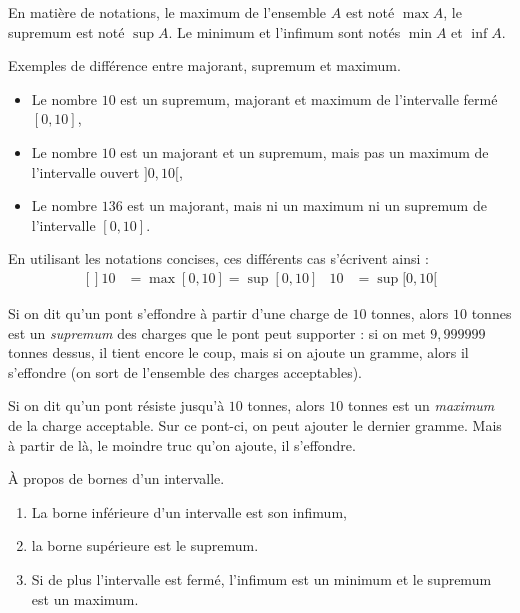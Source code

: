 En matière de notations, le maximum de l'ensemble $A$ est noté $\max A$, le supremum est noté $\sup A$. Le minimum et l'infimum sont notés $\min A$ et $\inf A$.

\begin{example}
	Exemples de différence entre majorant, supremum et maximum.
	\begin{itemize}
		\item Le nombre $10$ est un supremum, majorant et maximum de l'intervalle fermé $[0,10]$,
		\item Le nombre $10$ est un majorant et un supremum, mais pas un maximum de l'intervalle ouvert $]0,10[$,
		\item Le nombre $136$ est un majorant, mais ni un maximum ni un supremum de l'intervalle $[0,10]$.
	\end{itemize}
\end{example}

En utilisant les notations concises, ces différents cas s'écrivent ainsi :
\begin{equation}
	\begin{aligned}[]
		10 & =\max[0,10]=\sup[0,10] & 10 & =\sup[0,10[
	\end{aligned}
\end{equation}


\begin{example}
	Si on dit qu'un pont s'effondre à partir d'une charge de $10$ tonnes, alors $10$ tonnes est un \emph{supremum} des charges que le pont peut supporter : si on met $9,999999$ tonnes dessus, il tient encore le coup, mais si on ajoute un gramme, alors il s'effondre (on sort de l'ensemble des charges acceptables).
\end{example}

\begin{example}
	Si on dit qu'un pont résiste jusqu'à $10$ tonnes, alors $10$ tonnes est un \emph{maximum} de la charge acceptable. Sur ce pont-ci, on peut ajouter le dernier gramme. Mais à partir de là, le moindre truc qu'on ajoute, il s'effondre.
\end{example}

\begin{lemma}       \label{LEMooWCUXooFqTwDK}
	À propos de bornes d'un intervalle.
	\begin{enumerate}
		\item
		      La borne inférieure d'un intervalle est son infimum,
		\item
		      la borne supérieure est le supremum.
		\item
		      Si de plus l'intervalle est fermé, l'infimum est un minimum et le supremum est un maximum.
	\end{enumerate}
\end{lemma}


